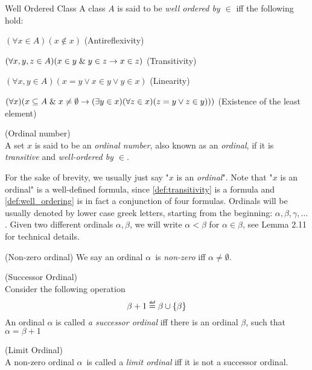 \begin{definition}{Well Ordered Class}\label{def:well_ordering}
A class $A$ is said to be \emph{well ordered by $\in$} iff the following hold:
\bce[(i)]
\item $(\forall x \in A)(x \not\in x)$ (Antireflexivity)
\item $(\forall x, y, z \in A)(x \in y \mathrel{\&} y \in z \rightarrow x \in z)$ (Transitivity)
\item $(\forall x, y \in A)(x = y \lor x \in y \lor y \in x)$ (Linearity)
\item $(\forall x)(x \subseteq A \mathrel{\&} x \neq \emptyset \rightarrow (\exists y \in x)(\forall z \in x)(z = y \lor z \in y)))$ (Existence of the least element)
\ece
\end{definition}

\begin{definition}{(Ordinal number)}\label{def:ordinal}\\
A set $x$ is said to be an \emph{ordinal number}, also known as an \emph{ordinal}, if it is \emph{transitive} and \emph{well-ordered by $\in$}. 
\end{definition}
For the sake of brevity, we usually just say "$x$ is an \emph{ordinal}". 
Note that "$x$ is an ordinal" is a well-defined formula, since \ref{def:transitivity} is a formula and \ref{def:well_ordering} is in fact a conjunction of four formulas.
Ordinals will be usually denoted by lower case greek letters, starting from the beginning: $\alpha, \beta, \gamma, \ldots$.
Given two different ordinals $\alpha, \beta$, we will write $\alpha < \beta$ for $\alpha \in \beta$, see \cite{JechBook}{Lemma 2.11} for technical details.

\begin{definition}{(Non-zero ordinal)}
We say an ordinal $\alpha$ is \emph{non-zero} iff $\alpha \neq \emptyset$.
\end{definition}

\begin{definition}{(Successor Ordinal)}\label{def:successor_ordinal}\\
Consider the following operation
\begin{equation}
\beta + 1 \defeq \beta \cup \{\beta\}
\end{equation}
An ordinal $\alpha$ is called \emph{a successor ordinal} iff there is an ordinal $\beta$, such that $\alpha = \beta+1$
\end{definition}

\begin{definition}{(Limit Ordinal)}\label{def:limit_ordinal}\\
A non-zero ordinal $\alpha$ is called a \emph{limit ordinal} iff it is not a successor ordinal.
\end{definition}

